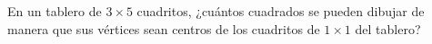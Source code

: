 En un tablero de $3 \times  5$ cuadritos, ¿cuántos cuadrados se pueden dibujar de manera que sus vértices sean centros de los cuadritos de $1 \times 1$ del tablero?